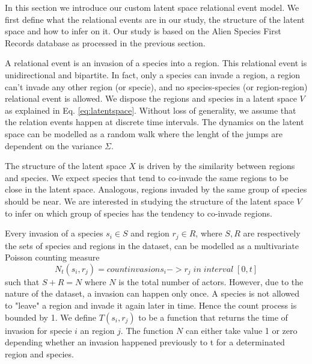 \documentclass[mscthesis]{usiinfthesis}
\begin{document}
In this section we introduce our custom latent space relational event model. We first define what the relational events are in our study, the structure of the latent space and how to infer on it. Our study is based on the Alien Species First Records database \cite{intro:dataset} as processed in the previous section.

A relational event is an invasion of a species into a region. This relational event is unidirectional and bipartite. In fact, only a species can invade a region, a region can't invade any other region (or specie), and no species-species (or region-region) relational event is allowed. We dispose the regions and species in a latent space $V$ as explained in Eq. \ref{eq:latentspace}. Without loss of generality, we assume that the relation events happen at discrete time intervals. The dynamics on the latent space can be modelled as a random walk where the lenght of the jumps are dependent on the variance $\Sigma$.



The structure of the latent space $X$ is driven by the similarity between regions and species. We expect species that tend to co-invade the same regions to be close in the latent space. Analogous, regions invaded by the same group of species should be near. We are interested in studying the structure of the latent space $V$ to infer on which group of species has the tendency to co-invade regions.

Every invasion of a species $s_i \in S$ and region $r_j \in R$, where $S, R$ are respectively the sets of species and regions in the dataset, can be modelled as a multivariate Poisson counting measure $$N_t(s_i, r_j) = count{invasion s_i -> r_j \; in \; interval \; [0, t]}$$ such that $S+R = N$ where $N$ is the total number of actors. However, due to the nature of the dataset, a invasion can happen only once. A species is not allowed to "leave" a region and invade it again later in time. Hence the count process is bounded by 1. We define $T(s_i, r_j)$ to be a function that returns the time of invasion for specie $i$ an region $j$. The function $N$ can either take value 1 or zero depending whether an invasion happened previously to t for a determinated region and species.
\end{document}

